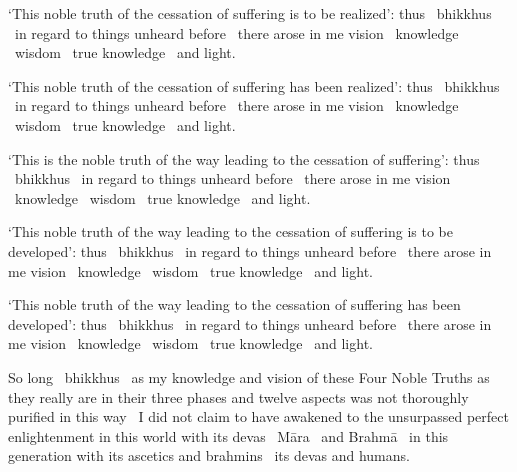 \begin{english-hang}
  `This noble truth of the cessation of suffering is to be realized': thus \breathmark\ bhikkhus \breathmark\ in regard to things unheard before \breathmark\ there arose in me vision \breathmark\ knowledge \breathmark\ wisdom \breathmark\ true knowledge \breathmark\ and light.
\end{english-hang}

\begin{english-hang}
  `This noble truth of the cessation of suffering has been realized': thus \breathmark\ bhikkhus \breathmark\ in regard to things unheard before \breathmark\ there arose in me vision \breathmark\ knowledge \breathmark\ wisdom \breathmark\ true knowledge \breathmark\ and light.
\end{english-hang}

\begin{english-hang}
  `This is the noble truth of the way leading to the cessation of suffering': thus \breathmark\ bhikkhus \breathmark\ in regard to things unheard before \breathmark\ there arose in me vision \breathmark\ knowledge \breathmark\ wisdom \breathmark\ true knowledge \breathmark\ and light.
\end{english-hang}

\begin{english-hang}
  `This noble truth of the way leading to the cessation of suffering is to be developed': thus \breathmark\ bhikkhus \breathmark\ in regard to things unheard before \breathmark\ there arose in me vision \breathmark\ knowledge \breathmark\ wisdom \breathmark\ true knowledge \breathmark\ and light.
\end{english-hang}

\begin{english-hang}
  `This noble truth of the way leading to the cessation of suffering has been developed': thus \breathmark\ bhikkhus \breathmark\ in regard to things unheard before \breathmark\ there arose in me vision \breathmark\ knowledge \breathmark\ wisdom \breathmark\ true knowledge \breathmark\ and light.
\end{english-hang}

\begin{english-hang}
  So long \breathmark\ bhikkhus \breathmark\ as my knowledge and vision of these Four Noble Truths as they really are in their three phases and twelve aspects was not thoroughly purified in this way \breathmark\ I did not claim to have awakened to the unsurpassed perfect enlightenment in this world with its devas \breathmark\ Māra \breathmark\ and Brahmā \breathmark\ in this generation with its ascetics and brahmins \breathmark\ its devas and humans.
\end{english-hang}

